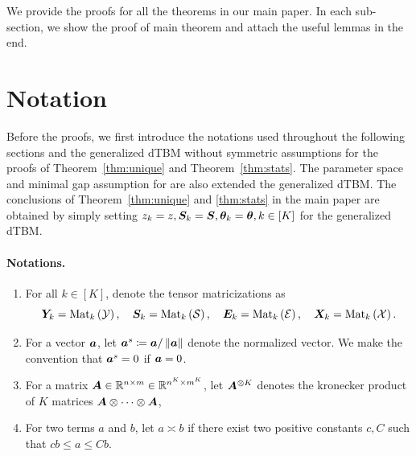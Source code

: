 \documentclass[lettersize,journal]{IEEEtran}
\theoremstyle{definition}
\theoremstyle{definition}
\newcommand{\of}[1]{\left(#1\right)}
\begin{document}




\newpage
\appendix


We provide the proofs for all the theorems in our main paper. In each sub-section, we show the proof of main theorem and attach the useful lemmas in the end.

\section*{Notation}
Before the proofs, we first introduce the notations used throughout the following sections and the generalized dTBM without symmetric assumptions for the proofs of Theorem~\ref{thm:unique} and Theorem~\ref{thm:stats}. The parameter space and minimal gap assumption for are also extended the generalized dTBM. The conclusions of Theorem~\ref{thm:unique} and \ref{thm:stats} in the main paper are obtained by simply setting $z_k = z, \bm S_k = \bm S, \boldsymbol{\theta}_k = \boldsymbol{\theta}, k \in [K]$ for the generalized dTBM.

\paragraph{Notations.}
\begin{enumerate}
    \item For all $ k \in [K]$, denote the tensor matricizations as
    \begin{equation}
        \mY_k = \mat_k \of{ \tY }, \quad \mS_k = \mat_k \of{\tS}, \quad \mE_k = \mat_k \of{ \tE}, \quad \mX_k = \mat_k \of{\tX}.
    \end{equation}
    \item For a vector $\bm{a}$, let $\bm{a}^{s} \coloneqq \bm{a}/\left\lVert\bm{a}\right\rVert$ denote the normalized vector. We make the convention that $\bm{a}^s = 0$ if $\bm{a} = 0$. 
    \item For a matrix $\bm A \in \mathbb{R}^{n \times m} \in \mathbb{R}^{n^K \times m^K}$, let $\bm A^{\otimes K}$ denotes the kronecker product of $K$ matrices $\bm A \otimes \cdots \otimes \bm A$,
    \item For two terms $a$ and $b$, let $a \asymp b$ if there exist two positive constants $c, C$ such that $cb \leq a\leq Cb$. 
\end{enumerate}
\end{document}

